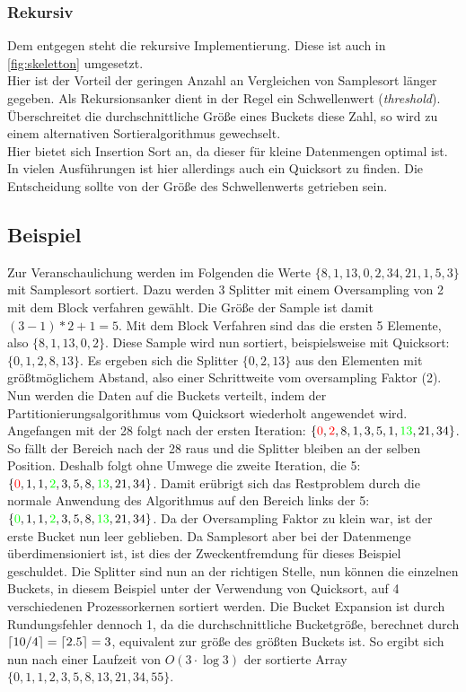		\subsubsection{Rekursiv}
			Dem entgegen steht die rekursive Implementierung.
			Diese ist auch in \ref{fig:skeletton} umgesetzt.\\
			Hier ist der Vorteil der geringen Anzahl an Vergleichen von Samplesort länger gegeben.
			Als Rekursionsanker dient in der Regel ein Schwellenwert (\textit{threshold}).
			Überschreitet die durchschnittliche Größe eines Buckets diese Zahl, so wird zu einem alternativen Sortieralgorithmus gewechselt.\\
			Hier bietet sich Insertion Sort an, da dieser für kleine Datenmengen optimal ist. \autocite{geeksforgeeks-2021} 
			In vielen Ausführungen ist hier allerdings auch ein Quicksort zu finden.
			Die Entscheidung sollte von der Größe des Schwellenwerts getrieben sein.
	
	\subsection{Beispiel}
		Zur Veranschaulichung werden im Folgenden die Werte $\{8,1,13,0,2,34,21,1,5,3\}$ mit Samplesort sortiert.
		Dazu werden 3 Splitter mit einem Oversampling von 2 mit dem Block verfahren gewählt.
		Die Größe der Sample ist damit $(3-1)*2+1=5$.
		Mit dem Block Verfahren sind das die ersten 5 Elemente, also $\{8,1,13,0,2\}$.
		Diese Sample wird nun sortiert, beispielsweise mit Quicksort: $\{0,1,2,8,13\}$.
		Es ergeben sich die Splitter $\{0,2,13\}$ aus den Elementen mit größtmöglichem Abstand, also einer Schrittweite vom oversampling Faktor (2).
		Nun werden die Daten auf die Buckets verteilt, indem der Partitionierungsalgorithmus vom Quicksort wiederholt angewendet wird.
		Angefangen mit der 28 folgt nach der ersten Iteration: $\{{\color{red}0},{\color{red}2},8,1,3,5,1,{\color{green}13},21,34\}$.
		So fällt der Bereich nach der 28 raus und die Splitter bleiben an der selben Position.
		Deshalb folgt ohne Umwege die zweite Iteration, die 5: $\{{\color{red}0},1,1,{\color{green}2},3,5,8,{\color{green}13},21,34\}$.
		Damit erübrigt sich das Restproblem durch die normale Anwendung des Algorithmus auf den Bereich links der 5: $\{{\color{green}0},1,1,{\color{green}2},3,5,8,{\color{green}13},21,34\}$.
		Da der Oversampling Faktor zu klein war, ist der erste Bucket nun leer geblieben.
		Da Samplesort aber bei der Datenmenge überdimensioniert ist, ist dies der Zweckentfremdung für dieses Beispiel geschuldet.
		Die Splitter sind nun an der richtigen Stelle, nun können die einzelnen Buckets, in diesem Beispiel unter der Verwendung von Quicksort, auf 4 verschiedenen Prozessorkernen sortiert werden.
		Die Bucket Expansion ist durch Rundungsfehler dennoch 1, da die durchschnittliche Bucketgröße, berechnet durch $\lceil10/4\rceil=\lceil2.5\rceil =3$, equivalent zur größe des größten Buckets ist.
		So ergibt sich nun nach einer Laufzeit von $O(3\cdot\log 3)$ der sortierte Array $\{0,1,1,2,3,5,8,13,21,34,55\}$.
